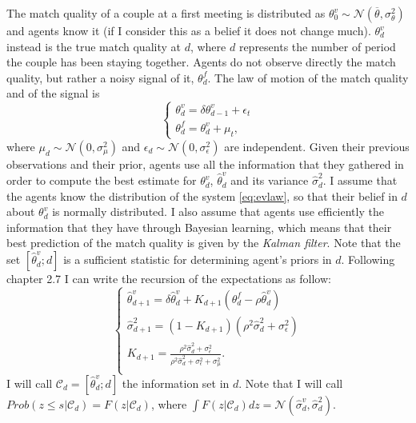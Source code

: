 \documentclass[12pt]{article}
\begin{document}
 The match quality of a couple at a first meeting is distributed as $\theta^v_0\sim\mathcal{N}(\overline{\theta},\sigma_\theta^2)$ and agents know it (if I consider this as a belief it does not change much). $\theta^v_d$ instead is the true match quality at $d$, where $d$ represents the number of period the couple has been staying together. Agents do not observe directly the match quality, but rather a noisy signal of it,  $\theta^f_d$. The law of motion of the match quality and of the signal is
\begin{equation}\label{eq:evlaw}
\begin{cases}
\theta^v_d=\delta\theta^v_{d-1}+\epsilon_t\\
\theta^f_d=\theta^v_{d}+\mu_t,
\end{cases}
\end{equation}
where $\mu_d\sim\mathcal{N}(0,\sigma_\mu^2)$ and  $\epsilon_d\sim\mathcal{N}(0,\sigma_\epsilon^2)$ are independent. Given their previous observations and their prior, agents use all the information that they gathered in order to compute the best estimate for $\theta^v_d$, $\hat{\theta}^v_d$ and its variance $\hat{\sigma}_{d}^2$. I assume that the agents know the distribution of the system \ref{eq:evlaw}, so that their belief in $d$ about $\theta^v_d$ is normally distributed. I also assume that agents use efficiently the information that they have through Bayesian learning, which means that their best prediction of the match quality is given by the \textit{Kalman filter}. Note  that the set $[\hat{\theta}^v_d;d]$ is a sufficient statistic for determining agent's priors in $d$. Following \citet{sargent2012} chapter 2.7 I can write the recursion of the expectations as follow:
\begin{equation}\label{eq:kalman}
\begin{cases}
\hat{\theta}^v_{d+1}=\delta \hat{\theta}^v_d+ K_{d+1}(\theta^f_d-\rho\hat{\theta}^v_d)\\
\hat{\sigma}_{d+1}^2=(1-K_{d+1})(\rho^2\hat{\sigma}_{d}^2+\sigma^2_\epsilon)\\
K_{d+1}=\frac{\rho^2\hat{\sigma}_{d}^2+\sigma^2_\epsilon}{\rho^2\hat{\sigma}_{d}^2+\sigma^2_\epsilon+\sigma_{\mu}^2}.\\
\end{cases}
\end{equation}
 I will call $\mathcal{C}_d=[\hat{\theta}^v_d;d]$ the information set in $d$. Note that I will call $Prob({z\leq s|\mathcal{C}_d})=F(z|\mathcal{C}_d)$, where $\int F(z|\mathcal{C}_d)dz=\mathcal{N}(\hat{\sigma}_d^v,\hat{\sigma}_{d}^2)$.
 
\end{document}
